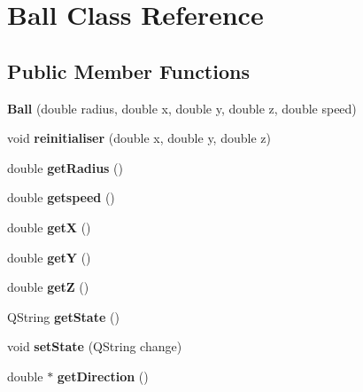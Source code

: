 \hypertarget{class_ball}{}\section{Ball Class Reference}
\label{class_ball}
\subsection*{Public Member Functions}
\begin{DoxyCompactItemize}
\item 
\mbox{\label{class_ball_a522a66cf500f94275cceb49b1635e962}} 
{\bfseries Ball} (double radius, double x, double y, double z, double speed)
\item 
\mbox{\label{class_ball_ae639c8f2030279739228019198021e99}} 
void {\bfseries reinitialiser} (double x, double y, double z)
\item 
\mbox{\label{class_ball_a5c1bcd887f634369ed2b205199c3323c}} 
double {\bfseries get\+Radius} ()
\item 
\mbox{\label{class_ball_a0d566e6196748ba2ff4c48e42b0ca7b1}} 
double {\bfseries getspeed} ()
\item 
\mbox{\label{class_ball_a6806cba5442118acd06f48fd02cdd5cc}} 
double {\bfseries getX} ()
\item 
\mbox{\label{class_ball_ac4e44551d59c3c09d28444b41e1c623b}} 
double {\bfseries getY} ()
\item 
\mbox{\label{class_ball_a44bd04f6ba99b9a43c94e83a0e209359}} 
double {\bfseries getZ} ()
\item 
\mbox{\label{class_ball_ad791ba74a79741d4d66f0fff6c1367d1}} 
Q\+String {\bfseries get\+State} ()
\item 
\mbox{\label{class_ball_a697519c70a27af56967b88a1c69bd92a}} 
void {\bfseries set\+State} (Q\+String change)
\item 
\mbox{\label{class_ball_af17cd3a404b572e9a87e7589ea7bd8f7}} 
double $\ast$ {\bfseries get\+Direction} ()
\item 

\end{DoxyCompactItemize}
